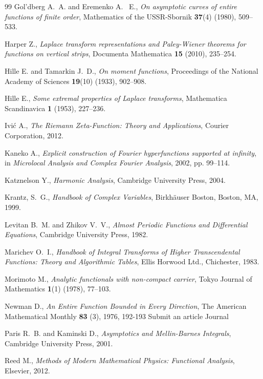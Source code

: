 \documentclass[12pt]{article}
\theoremstyle{definition}
\begin{document}
\begin{thebibliography}{99}
Gol'dberg A.~A. and  Eremenko A. ~E., \textit{On asymptotic curves of entire functions of finite order}, Mathematics of the USSR-Sbornik \textbf{37}(4) (1980), 509--533.

Harper Z., \textit{Laplace transform representations and Paley-Wiener theorems for functions on vertical strips}, Documenta Mathematica \textbf{15} (2010), 235–254.

Hille E. and Tamarkin J.~D., \textit{On moment functions}, Proceedings of the National Academy of Sciences \textbf{19}(10) (1933), 902–908.

Hille E., \textit{Some extremal properties of Laplace transforms}, Mathematica Scandinavica \textbf{1} (1953), 227–236.

Ivić A., \textit{The Riemann Zeta-Function: Theory and Applications}, Courier Corporation, 2012.

Kaneko A., \textit{Explicit construction of Fourier hyperfunctions supported at infinity}, in \textit{Microlocal Analysis and Complex Fourier Analysis}, 2002, pp. 99–114.

Katznelson Y., \textit{Harmonic Analysis}, Cambridge University Press, 2004.

Krantz, S.~G., \textit{Handbook of Complex Variables}, Birkhäuser Boston, Boston, MA, 1999.

Levitan B.~M. and Zhikov V.~V., \textit{Almost Periodic Functions and Differential Equations}, Cambridge University Press, 1982.

Marichev O.~I., \textit{Handbook of Integral Transforms of Higher Transcendental Functions: Theory and Algorithmic Tables}, Ellis Horwood Ltd., Chichester, 1983.

Morimoto M., \textit{Analytic functionals with non-compact carrier}, Tokyo Journal of Mathematics \textbf{1}(1) (1978), 77–103.

Newman D., \textit{An Entire Function Bounded in Every Direction}, The American Mathematical Monthly 
\textbf{83} (3), 1976, 192-193
Submit an article Journal

Paris R.~B. and Kaminski D., \textit{Asymptotics and Mellin-Barnes Integrals}, Cambridge University Press, 2001.

Reed M., \textit{Methods of Modern Mathematical Physics: Functional Analysis}, Elsevier, 2012.


\end{thebibliography}
\end{document}
